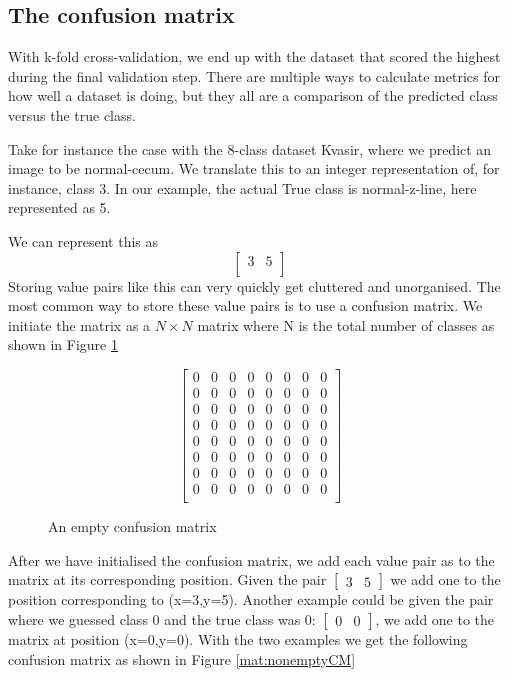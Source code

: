 \subsection{The confusion matrix}
With k-fold cross-validation, we end up with the dataset that scored the highest during the final validation step.  There are multiple ways to calculate metrics for how well a dataset is doing,  but they all are a comparison of the predicted class versus the true class.  

Take for instance the case with the 8-class dataset Kvasir, where we predict an image to be normal-cecum. We translate this to an integer representation of, for instance, class 3. In our example, the actual True class is normal-z-line, here represented as 5. 

We can represent this as 
\[
\begin{bmatrix}
 3 & 5\\ 
\end{bmatrix}
\]
Storing value pairs like this can very quickly get cluttered and unorganised.
The most common way to store these value pairs is to use a confusion matrix.  We initiate the matrix as a \textit{$N \times N$} matrix where N is the total number of classes as shown in Figure \ref{mat:emptyCM}

\begin{figure}[h]
    \myfontsize
    \centering
    \[
    \begin{bmatrix}
     0 & 0 &  0 &  0 &  0 &  0 &  0 &  0\\
     0 & 0 &  0 &  0 &  0 &  0 &  0 &  0\\
     0 & 0 &  0 &  0 &  0 &  0 &  0 &  0\\
     0 & 0 &  0 &  0 &  0 &  0 &  0 &  0\\
     0 & 0 &  0 &  0 &  0 &  0 &  0 &  0\\
     0 & 0 &  0 &  0 &  0 &  0 &  0 &  0\\
     0 & 0 &  0 &  0 &  0 &  0 &  0 &  0\\
     0 & 0 &  0 &  0 &  0 &  0 &  0 &  0\\
    \end{bmatrix}
    \]
    \caption{An empty confusion matrix}
    \label{mat:emptyCM}
\end{figure}



After we have initialised the confusion matrix, we add each value pair as to the matrix at its corresponding position.  
Given the pair $\begin{bmatrix} 3 & 5 \end{bmatrix}$ we add one to the position corresponding to (x=3,y=5). 
 Another example could be given the pair where we guessed class 0 and the true class was 0:  $\begin{bmatrix}  0 & 0 \end{bmatrix}$, we add one to the matrix at position (x=0,y=0). With the two examples we get the following confusion matrix as shown in Figure \ref{mat:nonemptyCM}

